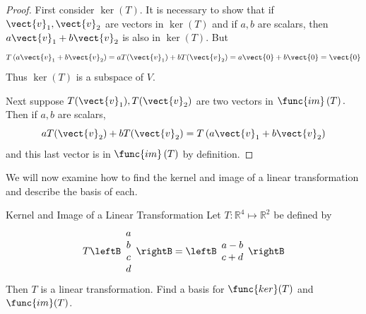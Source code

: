 \begin{proof}
First consider $\ker \left( T\right) .$ It is necessary to
show that if $\vect{v}_{1},\vect{v}_{2}$ are vectors in $\ker \left( T\right) $
and if $a,b$ are scalars, then $a\vect{v}_{1}+b\vect{v}_{2}$ is also in $\ker
\left( T\right) .$ But 
\begin{equation*}
T\left( a\vect{v}_{1}+b\vect{v}_{2}\right) =aT(\vect{v}_{1})+bT(\vect{v}_{2})=a\vect{0}+b\vect{0}=\vect{0}
\end{equation*}
Thus $\ker \left( T\right) $ is a subspace of $V$.

Next suppose $T(\vect{v}_{1}),T(\vect{v}_{2})$ are two vectors in $\func{im}\left(
T\right) .$ Then if $a,b$ are scalars, 
\begin{equation*}
aT(\vect{v}_{2})+bT(\vect{v}_{2})=T\left( a\vect{v}_{1}+b\vect{v}_{2}\right)
\end{equation*}
and this last vector is in $\func{im}\left( T\right) $ by definition. 
\end{proof}

We will now examine how to find the kernel and image of a linear transformation and describe the basis of each. 

\begin{example}{Kernel and Image of a Linear Transformation}\label{exa:kernelimage}
Let $T: \mathbb{R}^4 \mapsto \mathbb{R}^2$ be defined by
\[
T \leftB \begin{array}{c}
a \\
b \\
c \\
d
\end{array} \rightB = 
\leftB \begin{array}{c}
a - b \\ 
c + d
\end{array} \rightB
\]
Then $T$ is a linear transformation. Find a basis for $\func{ker}(T)$ and $\func{im}(T)$. 
\end{example}

